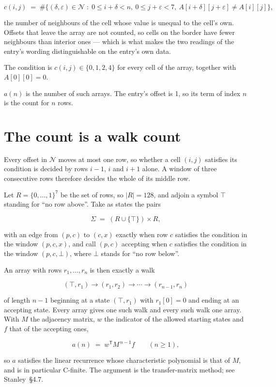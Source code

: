 \documentclass[11pt]{article}
\theoremstyle{definition}
\begin{document}
\[c(i,j) \;=\; \#\bigl\{(\delta,\varepsilon)\in\mathcal{N} \;:\; 0\le i+\delta<n,\ 0\le j+\varepsilon<7,\ A[i+\delta][j+\varepsilon] \neq A[i][j]\bigr\},\]

the number of neighbours of the cell whose value is unequal to the cell's own. Offsets that leave the array are not counted, so cells on the border have fewer neighbours than interior ones --- which is what makes the two readings of the entry's wording distinguishable on the entry's own data.

The condition is $c(i,j) \in \{0, 1, 2, 4\}$ for every cell of the array, together with $A[0][0]=0$.

$a(n)$ is the number of such arrays. The entry's offset is 1, so its term of index $n$ is the count for $n$ rows.

\section{The count is a walk count}

Every offset in $\mathcal{N}$ moves at most one row, so whether a cell $(i,j)$ satisfies its condition is decided by rows $i-1$, $i$ and $i+1$ alone. A window of three consecutive rows therefore decides the whole of its middle row.

Let $R = \{0,\dots,1\}^{7}$ be the set of rows, so $|R| = 128$, and adjoin a symbol $\top$ standing for ``no row above''. Take as states the pairs

\[\Sigma \;=\; (R \cup \{\top\}) \times R,\]

with an edge from $(p,c)$ to $(c,x)$ exactly when row $c$ satisfies the condition in the window $(p,c,x)$, and call $(p,c)$ accepting when $c$ satisfies the condition in the window $(p,c,\bot)$, where $\bot$ stands for ``no row below''.

An array with rows $r_1,\dots,r_n$ is then exactly a walk

\[(\top,r_1) \to (r_1,r_2) \to \cdots \to (r_{n-1},r_n)\]

of length $n-1$ beginning at a state $(\top,r_1)$ with $r_1[0]=0$ and ending at an accepting state. Every array gives one such walk and every such walk one array. With $M$ the adjacency matrix, $w$ the indicator of the allowed starting states and $f$ that of the accepting ones,

\[a(n) \;=\; w^{\mathsf T} M^{\,n-1} f \qquad (n \ge 1),\]

so $a$ satisfies the linear recurrence whose characteristic polynomial is that of $M$, and is in particular C-finite. The argument is the transfer-matrix method; see Stanley~\S4.7.
\end{document}
